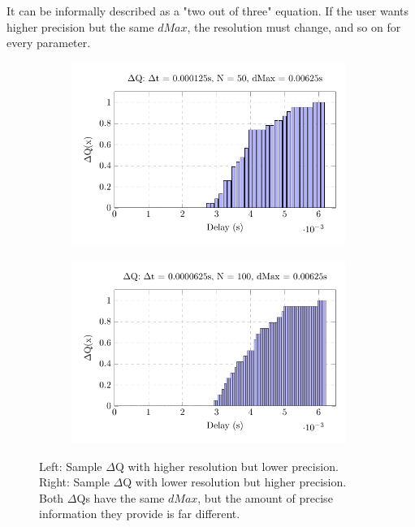     It can be informally described as a "two out of three" equation. If the user wants higher precision but the same $dMax$, the resolution must change, and so on for every parameter.
        \begin{figure}[H]
            \centering
            \begin{subfigure}{.5\textwidth}
                \centering
                \includegraphics[width =0.98\textwidth]{tikz/hist_50.pdf}
                \label{fig:hist_50}
            \end{subfigure}%
            \begin{subfigure}{.5\textwidth}%
                \centering%
                \includegraphics[width =0.98\textwidth]{tikz/hist_100.pdf}%
                \label{fig:hist_100}%
            \end{subfigure}%
            \label{fig:hist_dmax}%
            \caption{Left: Sample $\Delta$Q with higher resolution but lower precision. \\
            Right: Sample $\Delta$Q with lower resolution but higher precision. \\
            Both $\Delta$Qs have the same $dMax$, but the amount of precise information they provide is far different.}
        \end{figure}%

